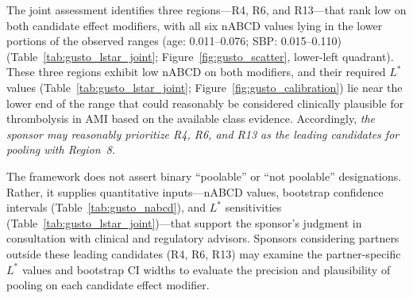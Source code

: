 The joint assessment identifies three regions---R4, R6, and R13---that rank low on both candidate effect modifiers, with all six nABCD values lying in the lower portions of the observed ranges (age: 0.011--0.076; SBP: 0.015--0.110) (Table~\ref{tab:gusto_lstar_joint}; Figure~\ref{fig:gusto_scatter}, lower-left quadrant). These three regions exhibit low nABCD on both modifiers, and their required $L^*$ values (Table~\ref{tab:gusto_lstar_joint}; Figure~\ref{fig:gusto_calibration}) lie near the lower end of the range that could reasonably be considered clinically plausible for thrombolysis in AMI based on the available class evidence. Accordingly, \emph{the sponsor may reasonably prioritize R4, R6, and R13 as the leading candidates for pooling with Region~8}.

The framework does not assert binary ``poolable'' or ``not poolable'' designations. Rather, it supplies quantitative inputs---nABCD values, bootstrap confidence intervals (Table~\ref{tab:gusto_nabcd}), and $L^*$ sensitivities (Table~\ref{tab:gusto_lstar_joint})---that support the sponsor's judgment in consultation with clinical and regulatory advisors. Sponsors considering partners outside these leading candidates (R4, R6, R13) may examine the partner-specific $L^*$ values and bootstrap CI widths to evaluate the precision and plausibility of pooling on each candidate effect modifier.

